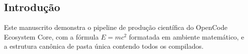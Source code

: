 \hypertarget{introduuxe7uxe3o}{%
\subsection{Introdução}\label{introduuxe7uxe3o}}

Este manuscrito demonstra o pipeline de produção científica do OpenCode
Ecosystem Core, com a fórmula \(E = mc^2\) formatada em ambiente
matemático, e a estrutura canônica de pasta única contendo todos os
compilados.
